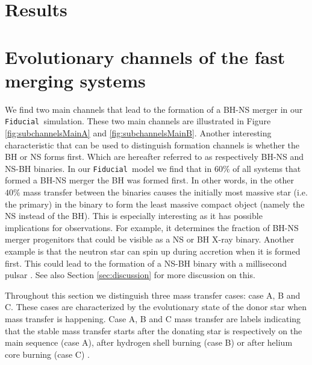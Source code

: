 \documentclass[a4paper,fleqn,usenatbib,useAMS,usedcolumn]{mnras}
\newcommand\Fiducial{\texttt{Fiducial }}
\begin{document}
\section{Results}
\label{sec:result}
%





\section{Evolutionary channels of the fast merging systems}
\label{sec:evolutionchannels}
We find two main channels that lead to the formation of  a BH-NS merger in our \Fiducial simulation. These two main channels are illustrated in Figure \ref{fig:subchannelsMainA} and \ref{fig:subchannelsMainB}. 
Another interesting characteristic that can be used to distinguish formation channels is whether the BH  or NS forms first. Which are hereafter referred to as respectively BH-NS and NS-BH binaries. In our \Fiducial model we find that in $60\%$
of all systems that formed a BH-NS merger the BH was formed first. In other words, in the other $40\%$  mass transfer between the binaries causes the initially most massive star (i.e. the primary) in the binary to form the least massive compact object (namely the NS instead of the BH). This is especially
interesting as it  has possible implications for observations. For example, it determines the fraction of  BH-NS merger progenitors that could be visible as a NS or BH X-ray binary.  Another example is that the neutron star can spin up during accretion when it is formed first. This could lead to the formation of a NS-BH binary with a millisecond pulsar \citep{Narayan:1991fn,Bethe:1998bn}. See also Section \ref{sec:discussion} for more discussion on this. 

Throughout this section we distinguish three mass transfer cases: case A, B and C. These cases are characterized by the evolutionary state of the donor star when mass transfer is happening. Case A, B and C mass transfer are labels indicating that the stable mass transfer starts after the donating star is  respectively on the main sequence (case A), after hydrogen shell burning (case B) or after helium core burning (case C) \citep{1970A&A.....7..150L}. 
\end{document}
